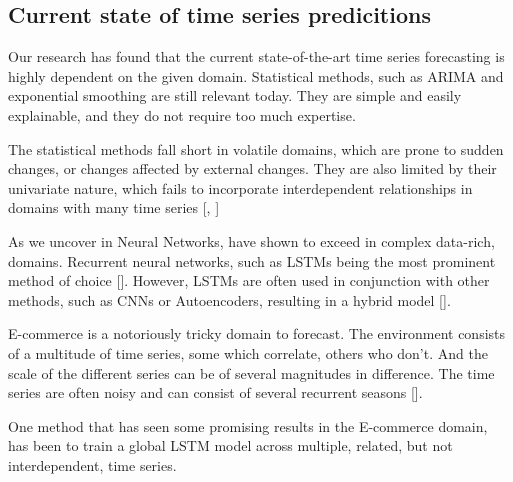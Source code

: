 \subsection{Current state of time series predicitions}


Our research has found that the current state-of-the-art time series forecasting is highly dependent
on the given domain. Statistical methods, such as ARIMA and exponential smoothing
are still relevant today. They are simple and easily explainable, and they do not require
too much expertise.

The statistical methods fall short in volatile domains, which are prone to sudden changes,
or changes affected by external changes. They are also limited by their univariate nature, which fails to
incorporate interdependent relationships in domains with many time series [, ]

As we uncover in  Neural Networks, have shown to exceed in complex data-rich, domains. Recurrent neural networks, such as LSTMs being the most
prominent method of choice []. However, LSTMs are often used in conjunction with other methods, such as CNNs or Autoencoders,
resulting in a hybrid model [].

E-commerce is a notoriously tricky domain to forecast. The environment consists of a multitude of time series,
some which correlate, others who don't. And the scale of the different series can be of several magnitudes in difference.
The time series are often noisy and can consist of several recurrent seasons [].

One method that has seen some promising results in the E-commerce domain, has been to train a global LSTM model across multiple,
related, but not interdependent, time series.


